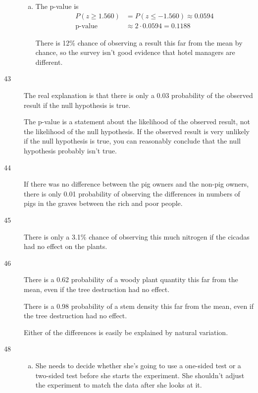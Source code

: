 \documentclass[letterpaper, landscape]{exam}
\begin{document}
\begin{description}
\begin{enumerate}[(a)]
          \item The p-value is 
            \begin{align*}
              P(z \geq 1.560) & = P(z \leq -1.560) \approx 0.0594 \\
              \text{p-value}  & \approx 2 \cdot 0.0594 = \boxed{ 0.1188 }
            \end{align*}

            There is 12\% chance of observing a result this far from the mean by
            chance, so the survey isn't good evidence that hotel managers are
            different.

        \end{enumerate}

      \item[43] The real explanation is that there is only a 0.03 probability of
        the observed result if the null hypothesis is true. 
        
        The p-value is a statement about the likelihood of the observed result,
        not the likelihood of the null hypothesis. If the observed result is
        very unlikely if the null hypothesis is true, you can reasonably
        conclude that the null hypothesis probably isn't true.

      \item[44] If there was no difference between the pig owners and the
        non-pig owners, there is only 0.01 probability of observing the
        differences in numbers of pigs in the graves between the rich and poor
        people.

      \item[45] There is only a 3.1\% chance of observing this much nitrogen if
        the cicadas had no effect on the plants.

      \item[46] There is a 0.62 probability of a woody plant quantity this far
        from the mean, even if the tree destruction had no effect.

        There is a 0.98 probability of a stem density this far from the mean, even
        if the tree destruction had no effect.

        Either of the differences is easily be explained by natural variation.

      \item[48] 
        \begin{enumerate}[(a)]
          \item She needs to decide whether she's going to use a one-sided test
            or a two-sided test before she starts the experiment. She shouldn't
            adjust the experiment to match the data after she looks at it.


\end{enumerate}
\end{description}
\end{document}

